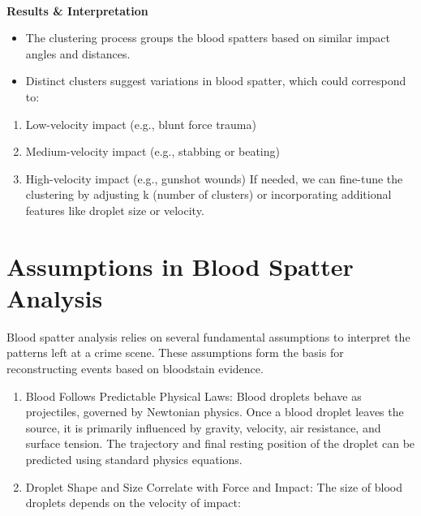 \documentclass[11pt]{article}
\providecommand{\tightlist}{%
      \setlength{\itemsep}{0pt}\setlength{\parskip}{0pt}}
\begin{document}
    \begin{center}
    \end{center}
    { \hspace*{\fill} \\}
    
    \textbf{Results \& Interpretation}

\begin{itemize}
\tightlist
\item
  The clustering process groups the blood spatters based on similar
  impact angles and distances.
\item
  Distinct clusters suggest variations in blood spatter, which could
  correspond to:
\end{itemize}

\begin{enumerate}
\def\labelenumi{\arabic{enumi}.}
\tightlist
\item
  Low-velocity impact (e.g., blunt force trauma)
\item
  Medium-velocity impact (e.g., stabbing or beating)
\item
  High-velocity impact (e.g., gunshot wounds) If needed, we can
  fine-tune the clustering by adjusting k (number of clusters) or
  incorporating additional features like droplet size or velocity.
\end{enumerate}

    \section{Assumptions in Blood Spatter
Analysis}\label{assumptions-in-blood-spatter-analysis}

Blood spatter analysis relies on several fundamental assumptions to
interpret the patterns left at a crime scene. These assumptions form the
basis for reconstructing events based on bloodstain evidence.

\begin{enumerate}
\def\labelenumi{\arabic{enumi}.}
\item
  Blood Follows Predictable Physical Laws: Blood droplets behave as
  projectiles, governed by Newtonian physics. Once a blood droplet
  leaves the source, it is primarily influenced by gravity, velocity,
  air resistance, and surface tension. The trajectory and final resting
  position of the droplet can be predicted using standard physics
  equations.
\item
  Droplet Shape and Size Correlate with Force and Impact: The size of
  blood droplets depends on the velocity of impact:
\end{enumerate}
\end{document}
